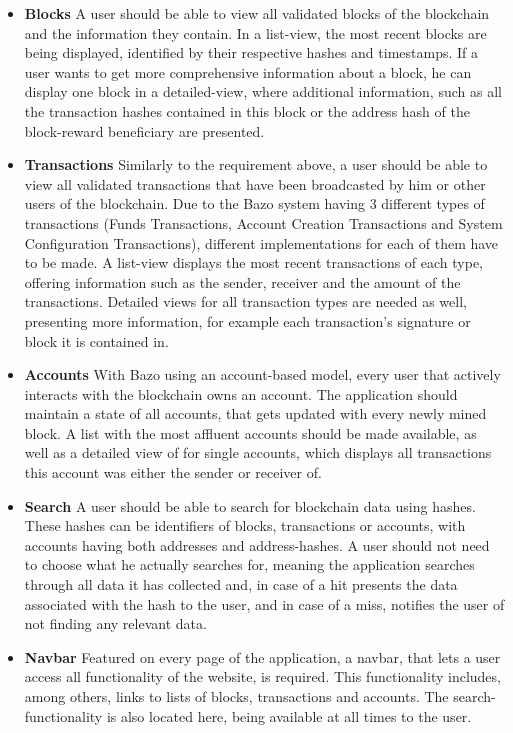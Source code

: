\begin{itemize}
\item \textbf{Blocks}
A user should be able to view all validated blocks of the blockchain and the information they contain. In a list-view, the most recent blocks are being displayed, identified by their respective hashes and timestamps. If a user wants to get more comprehensive information about a block, he can display one block in a detailed-view, where additional information, such as all the transaction hashes contained in this block or the address hash of the block-reward beneficiary are presented.
\item \textbf{Transactions}
Similarly to the requirement above, a user should be able to view all validated transactions that have been broadcasted by him or other users of the blockchain. Due to the Bazo system having 3 different types of transactions (Funds Transactions, Account Creation Transactions and System Configuration Transactions), different implementations for each of them have to be made. A list-view displays the most recent transactions of each type, offering information such as the sender, receiver and the amount of the transactions. Detailed views for all transaction types are needed as well, presenting more information, for example each transaction's signature or block it is contained in.
\item \textbf{Accounts}
With Bazo using an account-based model, every user that actively interacts with the blockchain owns an account. The application should maintain a state of all accounts, that gets updated with every newly mined block. A list with the most affluent accounts should be made available, as well as a detailed view of for single accounts, which displays all transactions this account was either the sender or receiver of.
\item \textbf{Search}
A user should be able to search for blockchain data using hashes. These hashes can be identifiers of blocks, transactions or accounts, with accounts having both addresses and address-hashes. A user should not need to choose what he actually searches for, meaning the application searches through all data it has collected and, in case of a hit presents the data associated with the hash to the user, and in case of a miss, notifies the user of not finding any relevant data.
\item \textbf{Navbar}
Featured on every page of the application, a navbar, that lets a user access all functionality of the website, is required. This functionality includes, among others, links to lists of blocks, transactions and accounts. The search-functionality is also located here, being available at all times to the user.

\end{itemize}
